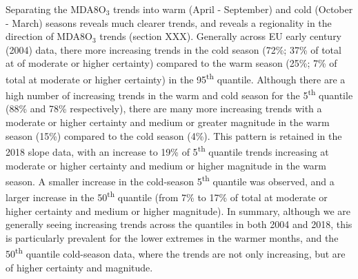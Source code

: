 \documentclass[journal abbreviation, manuscript]{copernicus}
\begin{document}

Separating the MDA8O$_3$ trends into warm (April - September) and cold (October - March) seasons reveals much clearer trends, and reveals a regionality in the direction of MDA8O$_3$ trends (section XXX). Generally across EU early century (2004) data, there more increasing trends in the cold season (72\%; 37\% of total at of moderate or higher certainty) compared to the warm season (25\%; 7\% of total at moderate or higher certainty) in the 95\textsuperscript{th} quantile. Although there are a high number of increasing trends in the warm and cold season for the 5\textsuperscript{th} quantile (88\% and 78\% respectively), there are many more increasing trends with a moderate or higher certainty and medium or greater magnitude in the warm season (15\%) compared to the cold season (4\%). This pattern is retained in the 2018 slope data, with an increase to 19\% of 5\textsuperscript{th} quantile trends increasing at moderate or higher certainty and medium or higher magnitude in the warm season. A smaller increase in the cold-season 5\textsuperscript{th} quantile was observed, and a larger increase in the 50\textsuperscript{th} quantile (from 7\% to 17\% of total at moderate or higher certainty and medium or higher magnitude). In summary, although we are generally seeing increasing trends across the quantiles in both 2004 and 2018, this is particularly prevalent for the lower extremes in the warmer months, and the 50\textsuperscript{th} quantile cold-season data, where the trends are not only increasing, but are of higher certainty and magnitude.
\end{document}
